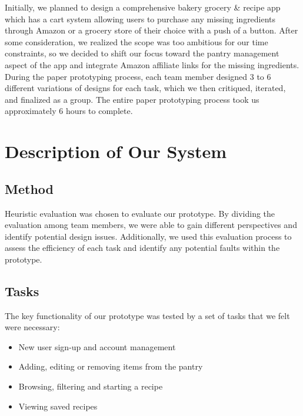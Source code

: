 \documentclass[manuscript, screen, nonacm]{acmart}
\begin{document}
    Initially, we planned to design a comprehensive bakery grocery \& recipe app which has a cart system allowing users to purchase any missing ingredients through Amazon or a grocery store of their choice with a push of a button. After some consideration, we realized the scope was too ambitious for our time constraints, so we decided to shift our focus toward the pantry management aspect of the app and integrate Amazon affiliate links for the missing ingredients. During the paper prototyping process, each team member designed 3 to 6 different variations of designs for each task, which we then critiqued, iterated, and finalized as a group. The entire paper prototyping process took us approximately 6 hours to complete.


\section{Description of Our System}
\subsection{Method}

    Heuristic evaluation was chosen to evaluate our prototype. By dividing the evaluation among team members, we were able to gain different perspectives and identify potential design issues. Additionally, we used this evaluation process to assess the efficiency of each task and identify any potential faults within the prototype.

\subsection{Tasks}
The key functionality of our prototype was tested by a set of tasks that we felt were necessary:

\begin{itemize}
    \item New user sign-up and account management
    \item Adding, editing or removing items from the pantry 
    \item Browsing, filtering and starting a recipe 
    \item Viewing saved recipes     
\end{itemize}
\end{document}

